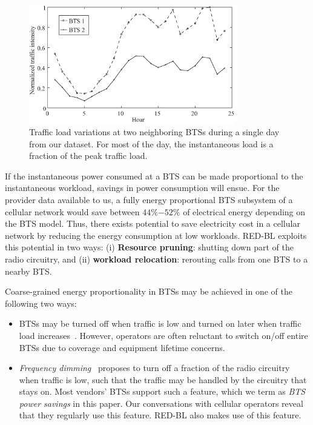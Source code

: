 \begin{figure}[t]
\centering
\includegraphics[width=0.8\textwidth]{pics/ilyas1.eps}
\caption{Traffic load variations at two neighboring BTSs during a single day from our dataset. For most of the day, the instantaneous load is a fraction of the peak traffic load.}
\label{fig:workload-variation}
\end{figure}


If the instantaneous power consumed at a BTS can be made proportional to the instantaneous
workload, savings in power consumption will ensue.
For the provider data available to us, a fully energy proportional BTS subsystem of a cellular network would save between $44\%$$-$$52\%$ of electrical energy depending on the BTS model.
Thus, there exists potential to save electricity cost in a cellular network by reducing the energy consumption at low workloads.
RED-BL exploits this potential in two ways: (i) \textbf{Resource pruning}: shutting down part of the radio circuitry, and (ii) \textbf{workload relocation}: rerouting calls from one BTS to a nearby BTS.

 
Coarse-grained energy proportionality in BTSs may be achieved in one of the following two ways:
\begin{itemize}
\item BTSs may be turned off when traffic is low and turned on later when traffic load
increases~\cite{Oh:TWC:2013,6503647,Oh:Globecom:2010,5208045,Oh:Comm:2011,marsan:wgreen:2008}.
However, operators are often reluctant to switch on/off entire BTSs due to coverage and equipment lifetime concerns.
\item \textit{Frequency dimming}~\cite{Tipper:Dimming:Globecom:2010} proposes to turn off a fraction of
the radio circuitry when traffic is low, such that the traffic may be handled by the circuitry that stays on.
Most vendors' BTSs support such a feature, which we term as \textit{BTS power savings} in this paper.
Our conversations with cellular operators reveal that they regularly use this feature. RED-BL also makes use
of this feature.
\end{itemize}

